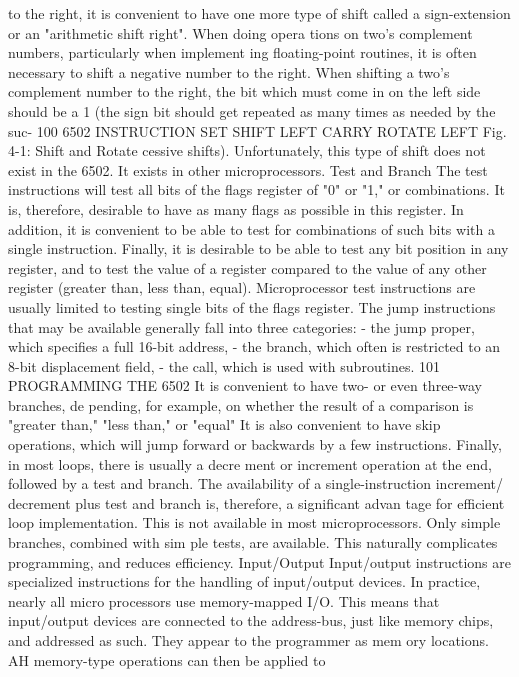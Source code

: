 to the right, it is convenient to have one more type of shift called
a sign-extension or an "arithmetic shift right". When doing opera
tions on two's complement numbers, particularly when implement
ing floating-point routines, it is often necessary to shift a negative
number to the right. When shifting a two's complement number to
the right, the bit which must come in on the left side should be a 1
(the sign bit should get repeated as many times as needed by the suc-
100
6502 INSTRUCTION SET
SHIFT LEFT
CARRY
ROTATE LEFT
Fig. 4-1: Shift and Rotate
cessive shifts). Unfortunately, this type of shift does not exist in the
6502. It exists in other microprocessors.
Test and Branch
The test instructions will test all bits of the flags register of "0"
or "1," or combinations. It is, therefore, desirable to have as many
flags as possible in this register. In addition, it is convenient to be
able to test for combinations of such bits with a single instruction.
Finally, it is desirable to be able to test any bit position in any
register, and to test the value of a register compared to the value of
any other register (greater than, less than, equal). Microprocessor
test instructions are usually limited to testing single bits of the
flags register.
The jump instructions that may be available generally fall into
three categories:
- the jump proper, which specifies a full 16-bit address,
- the branch, which often is restricted to an 8-bit displacement
field,
- the call, which is used with subroutines.
101
PROGRAMMING THE 6502
It is convenient to have two- or even three-way branches, de
pending, for example, on whether the result of a comparison is
"greater than," "less than," or "equal" It is also convenient to
have skip operations, which will jump forward or backwards by a
few instructions. Finally, in most loops, there is usually a decre
ment or increment operation at the end, followed by a test and
branch. The availability of a single-instruction increment/
decrement plus test and branch is, therefore, a significant advan
tage for efficient loop implementation. This is not available in
most microprocessors. Only simple branches, combined with sim
ple tests, are available. This naturally complicates programming,
and reduces efficiency.
Input/Output
Input/output instructions are specialized instructions for the
handling of input/output devices. In practice, nearly all micro
processors use memory-mapped I/O. This means that input/output
devices are connected to the address-bus, just like memory chips,
and addressed as such. They appear to the programmer as mem
ory locations. AH memory-type operations can then be applied to
